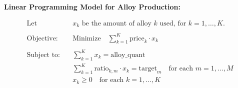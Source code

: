 \documentclass{article}
\begin{document}
\textbf{Linear Programming Model for Alloy Production:}

\begin{align*}
\text{Let } & x_k \text{ be the amount of alloy } k \text{ used, for } k = 1, \ldots, K. \\
\\
\text{Objective:} \quad & \text{Minimize} \quad \sum_{k=1}^{K} \text{price}_k \cdot x_k \\
\\
\text{Subject to:} \quad & \sum_{k=1}^{K} x_k = \text{alloy\_quant} \\
& \sum_{k=1}^{K} \text{ratio}_{k, m} \cdot x_k = \text{target}_m \quad \text{for each } m = 1, \ldots, M \\
& x_k \geq 0 \quad \text{for each } k = 1, \ldots, K
\end{align*}
\end{document}
